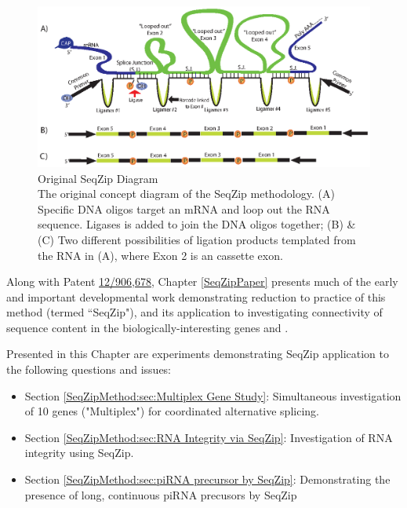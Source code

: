   \begin{figure} %
    \centering 
    \includegraphics{Figures/SeqZipMethod/OriginalSeqZipDiagram.eps}
    \caption[Original SeqZip Diagram]
    {
      Original SeqZip Diagram\\[0.25cm]
      The original concept diagram of the SeqZip methodology. (A) Specific DNA oligos target an mRNA and loop out the RNA sequence. Ligases is added to join the DNA oligos together; (B) \& (C) Two different possibilities of ligation products templated from the RNA in (A), where Exon 2 is an cassette exon.
    	}
    \label{SeqZipMethod:fig:Original SeqZip Diagram}
  	\end{figure}

  Along with Patent \href{http://1.usa.gov/PTG9BB}{12/906,678}, Chapter \ref{SeqZipPaper} presents much of the early and important developmental work demonstrating reduction to practice of this method (termed ``SeqZip"), and its application to investigating connectivity of sequence content in the biologically-interesting genes \fn{} and \dscam{}. 

  Presented in this Chapter are experiments demonstrating SeqZip application to the following questions and issues:

  \begin{itemize} %
    \singlespacing
    \item Section \ref{SeqZipMethod:sec:Multiplex Gene Study}: 
      Simultaneous investigation of 10 genes ("Multiplex") for coordinated alternative splicing.
    \item Section \ref{SeqZipMethod:sec:RNA Integrity via SeqZip}: 
      Investigation of RNA integrity using SeqZip.
    \item Section \ref{SeqZipMethod:sec:piRNA precursor by SeqZip}: 
      Demonstrating the presence of long, continuous piRNA precusors by SeqZip
	  \end{itemize}

